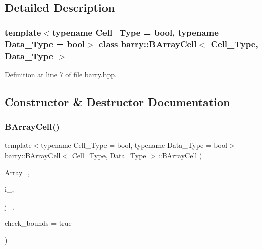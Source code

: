 \subsection{Detailed Description}
\subsubsection*{template$<$typename Cell\+\_\+\+Type = bool, typename Data\+\_\+\+Type = bool$>$\newline
class barry\+::\+B\+Array\+Cell$<$ Cell\+\_\+\+Type, Data\+\_\+\+Type $>$}



Definition at line 7 of file barry.\+hpp.



\subsection{Constructor \& Destructor Documentation}
\mbox{\label{classbarry_1_1_b_array_cell_a86b3c145bfd9e3d8d4a21050580f37bd}} 
\subsubsection{\texorpdfstring{B\+Array\+Cell()}{BArrayCell()}}
{\footnotesize\ttfamily template$<$typename Cell\+\_\+\+Type  = bool, typename Data\+\_\+\+Type  = bool$>$ \\
\hyperlink{classbarry_1_1_b_array_cell}{barry\+::\+B\+Array\+Cell}$<$ Cell\+\_\+\+Type, Data\+\_\+\+Type $>$\+::\hyperlink{classbarry_1_1_b_array_cell}{B\+Array\+Cell} (\begin{DoxyParamCaption}\item[{\hyperlink{classbarry_1_1_b_array}{B\+Array}$<$ Cell\+\_\+\+Type, Data\+\_\+\+Type $>$ $\ast$}]{Array\+\_\+,  }\item[{\hyperlink{namespacebarry_a11dfc53ddb4672278319aa04f1e09a6c}{uint}}]{i\+\_\+,  }\item[{\hyperlink{namespacebarry_a11dfc53ddb4672278319aa04f1e09a6c}{uint}}]{j\+\_\+,  }\item[{bool}]{check\+\_\+bounds = {\ttfamily true} }\end{DoxyParamCaption})\hspace{0.3cm}{\ttfamily [inline]}}



